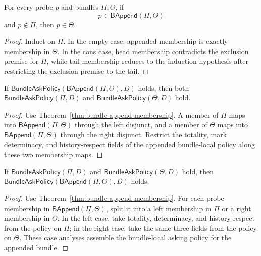 \begin{theorem}
\label{thm:bundle-append-membership-right-of-not-left}
For every probe \(p\) and bundles \(\Pi,\Theta\), if
$$
p\in\mathsf{BAppend}(\Pi,\Theta)
$$
and \(p\notin\Pi\), then \(p\in\Theta\).
\end{theorem}
\begin{proof}
Induct on \(\Pi\). In the empty case, appended membership is exactly membership
in \(\Theta\). In the cons case, head membership contradicts the exclusion
premise for \(\Pi\), while tail membership reduces to the induction hypothesis
after restricting the exclusion premise to the tail.
\end{proof}

\begin{theorem}
\label{thm:bundle-local-policy-append-restriction}
If $\mathsf{BundleAskPolicy}(\mathsf{BAppend}(\Pi,\Theta),D)$ holds, then both $\mathsf{BundleAskPolicy}(\Pi,D)$ and $\mathsf{BundleAskPolicy}(\Theta,D)$ hold.
\end{theorem}
\begin{proof}
Use Theorem~\ref{thm:bundle-append-membership}. A member of $\Pi$ maps into $\mathsf{BAppend}(\Pi,\Theta)$ through the left disjunct, and a member of $\Theta$ maps into $\mathsf{BAppend}(\Pi,\Theta)$ through the right disjunct. Restrict the totality, mark determinacy, and history-respect fields of the appended bundle-local policy along these two membership maps.
\end{proof}

\begin{theorem}
\label{thm:bundle-local-policy-append-gluing}
If $\mathsf{BundleAskPolicy}(\Pi,D)$ and $\mathsf{BundleAskPolicy}(\Theta,D)$ hold, then $\mathsf{BundleAskPolicy}(\mathsf{BAppend}(\Pi,\Theta),D)$ holds.
\end{theorem}
\begin{proof}
Use Theorem~\ref{thm:bundle-append-membership}. For each probe membership in $\mathsf{BAppend}(\Pi,\Theta)$, split it into a left membership in $\Pi$ or a right membership in $\Theta$. In the left case, take totality, determinacy, and history-respect from the policy on $\Pi$; in the right case, take the same three fields from the policy on $\Theta$. These case analyses assemble the bundle-local asking policy for the appended bundle.
\end{proof}

